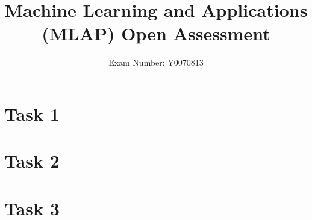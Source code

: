 \documentclass{article}
\begin{document}
	\title{Machine Learning and Applications (MLAP) Open Assessment}
	\author{Exam Number: Y0070813}
	\maketitle
	\section{Task 1}
	\section{Task 2}
	\section{Task 3}
	
\end{document}
